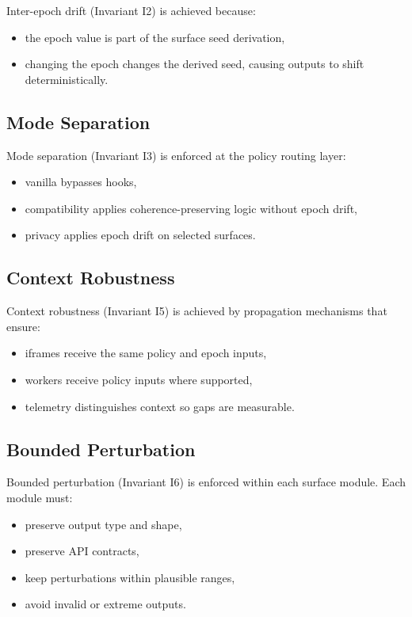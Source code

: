 \documentclass[11pt]{report}
\begin{document}
Inter-epoch drift (Invariant I2) is achieved because:
\begin{itemize}
    \item the epoch value is part of the surface seed derivation,
    \item changing the epoch changes the derived seed, causing outputs to shift deterministically.
\end{itemize}

\subsection{Mode Separation}

Mode separation (Invariant I3) is enforced at the policy routing layer:
\begin{itemize}
    \item vanilla bypasses hooks,
    \item compatibility applies coherence-preserving logic without epoch drift,
    \item privacy applies epoch drift on selected surfaces.
\end{itemize}

\subsection{Context Robustness}

Context robustness (Invariant I5) is achieved by propagation mechanisms that ensure:
\begin{itemize}
    \item iframes receive the same policy and epoch inputs,
    \item workers receive policy inputs where supported,
    \item telemetry distinguishes context so gaps are measurable.
\end{itemize}

\subsection{Bounded Perturbation}

Bounded perturbation (Invariant I6) is enforced within each surface module. Each module must:
\begin{itemize}
    \item preserve output type and shape,
    \item preserve API contracts,
    \item keep perturbations within plausible ranges,
    \item avoid invalid or extreme outputs.
\end{itemize}
\end{document}
